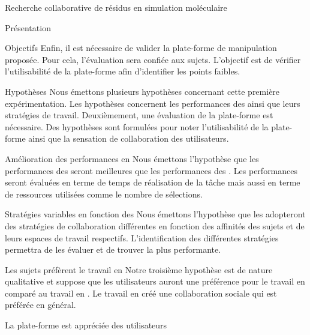 \documentclass[myfrancais]{mythesis}
\begin{document}
\begin{mychapter}{Recherche collaborative de résidus en simulation moléculaire}
\begin{mysection}{Présentation}
\begin{mysubsection}{Objectifs}
				Enfin, il est nécessaire de valider la plate-forme de manipulation proposée.
				Pour cela, l'évaluation sera confiée aux sujets.
				L'objectif est de vérifier l'utilisabilité de la plate-forme afin d'identifier les points faibles.
			\end{mysubsection}
			\begin{mysubsection}{Hypothèses}
				Nous émettons plusieurs hypothèses concernant cette première expérimentation.
				Les hypothèses concernent les performances des  ainsi que leurs stratégies de travail.
				Deuxièmement, une évaluation de la plate-forme est nécessaire.
				Des hypothèses sont formulées pour noter l'utilisabilité de la plate-forme ainsi que la sensation de collaboration des utilisateurs.
				\begin{myparagraph}{ Amélioration des performances en }
					Nous émettons l'hypothèse que les performances des  seront meilleures que les performances des .
					Les performances seront évaluées en terme de temps de réalisation de la tâche mais aussi en terme de ressources utilisées comme le nombre de sélections.
				\end{myparagraph}
				\begin{myparagraph}{ Stratégies variables en fonction des }
					Nous émettons l'hypothèse que les  adopteront des stratégies de collaboration différentes en fonction des affinités des sujets et de leurs espaces de travail respectifs.
					L'identification des différentes stratégies permettra de les évaluer et de trouver la plus performante.
				\end{myparagraph}
				\begin{myparagraph}{ Les sujets préfèrent le travail en }
					Notre troisième hypothèse est de nature qualitative et suppose que les utilisateurs auront une préférence pour le travail en  comparé au travail en .
					Le travail en  créé une collaboration sociale qui est préférée en général.
				\end{myparagraph}
				\begin{myparagraph}{ La plate-forme est appréciée des utilisateurs}

\end{myparagraph}
\end{mysubsection}
\end{mysection}
\end{mychapter}
\end{document}
